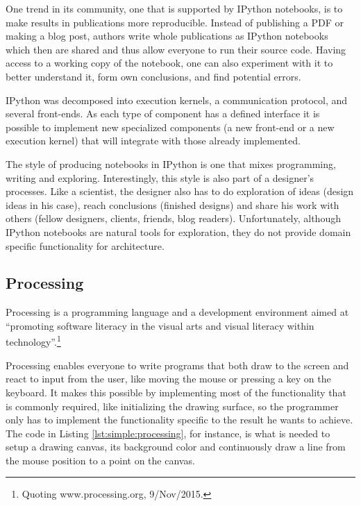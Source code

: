 One trend in its community, one that is supported by IPython notebooks, is to make results in publications more reproducible.
Instead of publishing a PDF or making a blog post, authors write whole publications as IPython notebooks which then are shared and thus allow everyone to run their source code.
Having access to a working copy of the notebook, one can also experiment with it to better understand it, form own conclusions, and find potential errors.

IPython was decomposed into execution kernels, a communication protocol, and several front-ends.
As each type of component has a defined interface it is possible to implement new specialized components (a new front-end or a new execution kernel) that will integrate with those already implemented.

The style of producing notebooks in IPython is one that mixes programming, writing and exploring.
Interestingly, this style is also part of a designer's processes.
Like a scientist, the designer also has to do exploration of ideas (design ideas in his case), reach conclusions (finished designs) and share his work with others (fellow designers, clients, friends, blog readers).
Unfortunately, although IPython notebooks are natural tools for exploration, they do not provide domain specific functionality for architecture.


\subsection{Processing}
\label{section:processing:related}
Processing\cite{reas2007processing} is a programming language and a development environment aimed at ``promoting software literacy in the visual arts and visual literacy within technology''.\footnote{Quoting www.processing.org, 9/Nov/2015.}

Processing enables everyone to write programs that both draw to the screen and react to input from the user, like moving the mouse or pressing a key on the keyboard.
It makes this possible by implementing most of the functionality that is commonly required, like initializing the drawing surface, so the programmer only has to implement the functionality specific to the result he wants to achieve.
The code in Listing \ref{lst:simple:processing}, for instance, is what is needed to setup a drawing canvas, its background color and continuously draw a line from the mouse position to a point on the canvas.

